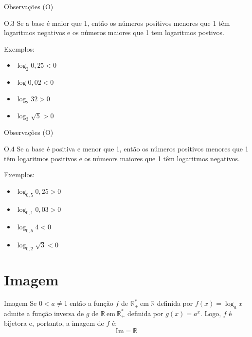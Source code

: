 \documentclass[12pt]{beamer}
\begin{document}
    \begin{frame}{Observações (O)}
        \begin{block}{O.3}
            Se a base é maior que 1, então os números positivos menores que 1 têm logaritmos
            negativos e os números maiores que 1 tem logaritmos postivos.
        \end{block} Exemplos:

        \begin{itemize}
            \item [a)] $\log_{2}0,25 < 0$
            \item [b)] $\log 0,02 < 0$
            \item [c)] $\log_{2}32 > 0$
            \item [d)] $\log_{3} \sqrt{5} > 0$
        \end{itemize}
    \end{frame}

    \begin{frame}{Observações (O)}
        \begin{block}{O.4}
            Se a base é positiva e menor que 1, então os números positivos menores que 1 têm
            logaritmos positivos e os númeors maiores que 1 têm logaritmos negativos.
        \end{block} Exemplos:

        \begin{itemize}
            \item [a)] $\log_{0,5}0,25 > 0$
            \item [b)] $\log_{0,1}0,03 > 0$
            \item [c)] $\log_{0,5}4 < 0$
            \item [d)] $\log_{0,2}\sqrt{3} < 0$
        \end{itemize}
    \end{frame}

\section{Imagem}

    \begin{frame}{Imagem}
        \justifying
        Se $0<a\neq 1$ então a função $f$ de $\mathbb{R_{+}^*} \ \text{em} \ \mathbb{R}$ definida
        por $f(x)=\log_{a}x$ admite a função inversa de $g$ de $\mathbb{R} \ \text{em} \ \mathbb{R_{+}^*}$ definida
        por $g(x)=a^{x}$. Logo, $f$ é bijetora e, portanto, a imagem de $f$ é: $$\text{Im} = \mathbb{R}$$
    \end{frame}
\end{document}
